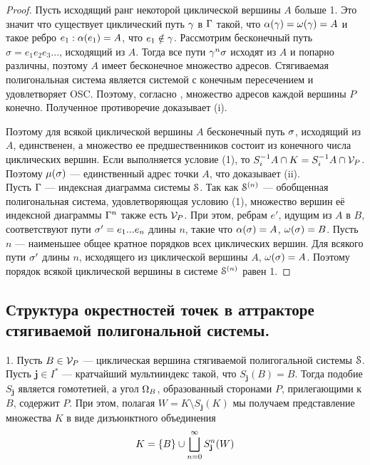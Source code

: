 \begin{proof}
Пусть исходящий ранг некоторой циклической вершины $A$ больше 1. 
Это значит что существует циклический путь $\gamma$ в $\Gamma$ такой, что $\alpha(\gamma)=\omega(\gamma)=A$  и такое ребро $e_1: \alpha(e_1)=A$, что $e_1\notin\gamma$. 
Рассмотрим бесконечный путь $\sigma=e_1 e_2 e_3...$, исходящий из $A$. 
Тогда все пути $\gamma^n\sigma$ исходят из $A$ и попарно различны, поэтому $A$ имеет бесконечное множество адресов. 
Стягиваемая полигональная система является системой с конечным пересечением и удовлетворяет OSC. Поэтому, согласно \cite[Theorem 1.7]{FIP}, множество адресов каждой вершины $P$ конечно. 
Полученное противоречие доказывает (i).
 
Поэтому для всякой циклической вершины $A$ бесконечный путь $\sigma$, исходящий из $A$,  единственен, а множество ее предшественников состоит из конечного числа циклических вершин. 
Если выполняется условие (1), то $S_i^{-1}A\cap K=S_i^{-1}A\cap {\mathcal V}_P$. Поэтому $\mu(\sigma)$ --- единственный адрес точки $A$, что доказывает (ii).\\

Пусть $\Gamma$ --- индексная диаграмма системы ${\EuScript S}$. 
Так как
${\EuScript S}^{(n)}$ --- обобщенная полигональная система, удовлетворяющая  условию (1), множество  вершин её индексной диаграммы $\Gamma^n$ также есть   ${\mathcal V}_P$.  При этом, ребрам $e'$, идущим из $A$
в $B$, соответствуют пути $\sigma'=e_1...e_n$ длины $n$, такие что $\alpha(\sigma)=A$, $\omega(\sigma)=B$.
Пусть $n$ --- наименьшее общее кратное порядков всех циклических вершин. 
Для всякого пути $\sigma'$ длины $n$, исходящего из циклической вершины $A$, $\omega(\sigma)=A$. 
Поэтому порядок всякой циклической вершины в системе ${\EuScript S}^{(n)}$ равен 1.
\end{proof}


\subsection{Структура окрестностей точек в аттракторе стягиваемой полигональной системы.}

1. Пусть  $B\in{\mathcal V}_P$ --- циклическая вершина стягиваемой полигогальной системы ${\EuScript S}$. 
Пусть $\bm{j}\in I^*$ --- кратчайший мультииндекс  такой, что $S_{\bm{j}}(B)=B$. 
Тогда подобие $S_{\bm{j}}$ является гомотетией, а угол $\Omega_B$, образованный сторонами $P$, прилегающими к $B$, содержит $P$. 
При этом, полагая $W=K\setminus S_{\bm{j}}(K)$ мы получаем представление множества $K$  в виде дизъюнктного объединения 
\begin{equation}\label{wprc}
 K=\{B\}\cup\bigsqcup\limits_{n=0}^\infty S_{{\bf{j}}}^n(W)   
\end{equation}

